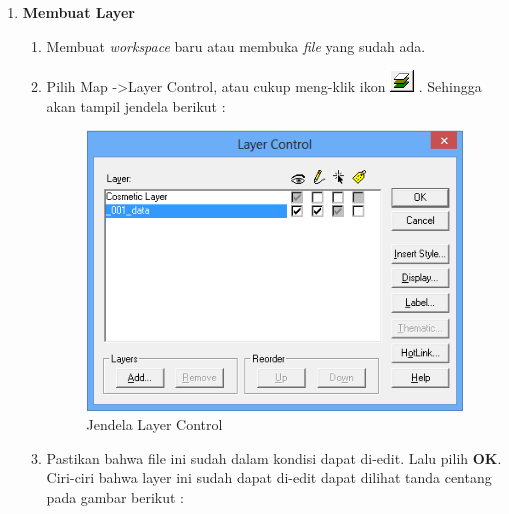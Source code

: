 \begin{enumerate}[\bfseries A.]
\begin{enumerate}[1.]
  \end{enumerate}
  
  \item \textbf{Membuat Layer}
  
  \begin{enumerate}[1.]
    \item Membuat \textit{workspace} baru atau membuka \textit{file} yang sudah ada.
  
    \item Pilih Map -\textgreater  Layer Control, atau cukup meng-klik ikon \includegraphics{./resources/004-ikon-layer-kontrol} . Sehingga akan tampil jendela berikut :
    
    \begin{figure}[H]
      \centering
      \includegraphics[width=1\textwidth]{./resources/005-jendela-layer-control}
      \caption{Jendela Layer Control}
    \end{figure}
    
    \item Pastikan bahwa file ini sudah dalam kondisi dapat di-edit. Lalu pilih \textbf{OK}. Ciri-ciri bahwa layer ini sudah dapat di-edit dapat dilihat tanda centang pada gambar berikut :
    

\end{enumerate}
\end{enumerate}
